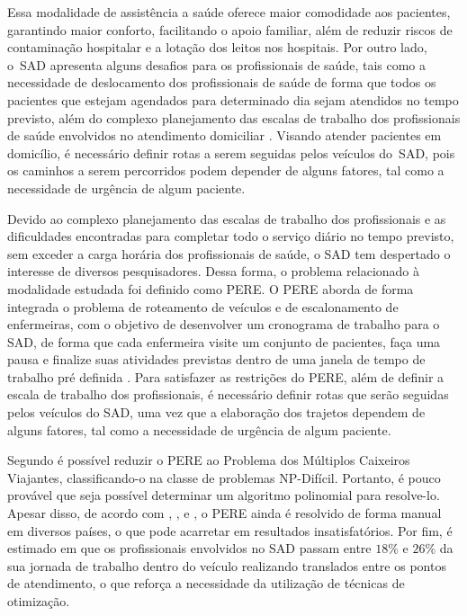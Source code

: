 Essa modalidade de assistência a saúde oferece maior comodidade aos pacientes, garantindo maior conforto, facilitando o apoio familiar, além de reduzir riscos de contaminação hospitalar e a lotação dos leitos nos hospitais.
Por outro lado, o~\ac{SAD} apresenta alguns desafios para os profissionais de saúde, tais como a necessidade de deslocamento dos profissionais de saúde de forma  que todos os pacientes que estejam agendados para determinado dia sejam atendidos no tempo previsto, além do complexo planejamento das escalas de trabalho dos profissionais de saúde envolvidos no atendimento domiciliar \cite{Kergosien:2009}. 
Visando atender pacientes em domicílio, é necessário definir rotas a serem seguidas pelos veículos do~\ac{SAD}, pois os caminhos a serem percorridos podem depender de alguns fatores, tal como a necessidade de urgência de algum paciente. 

Devido ao complexo planejamento das escalas de trabalho dos profissionais e as dificuldades encontradas para completar todo o serviço diário no tempo previsto, sem exceder a carga horária dos profissionais de saúde, o \ac{SAD} tem despertado o interesse de diversos pesquisadores. Dessa forma, o problema relacionado à modalidade estudada foi definido como \ac{PERE}.
O \ac{PERE} aborda de forma integrada o problema de roteamento de veículos e de escalonamento de enfermeiras, com o objetivo de desenvolver um cronograma de trabalho para o \ac{SAD}, de forma que cada enfermeira visite um conjunto de pacientes, faça uma pausa e finalize suas atividades previstas dentro de uma janela de tempo de trabalho pré definida \cite{trabelsi:2012}. 
Para satisfazer as restrições do \ac{PERE}, além de definir a escala de trabalho dos profissionais, é necessário definir rotas que serão seguidas pelos veículos do \ac{SAD}, uma vez que a elaboração dos trajetos dependem de alguns fatores, tal como a necessidade de urgência de algum paciente. 

Segundo  é possível reduzir o PERE ao Problema dos Múltiplos Caixeiros Viajantes, classificando-o na classe de problemas NP-Difícil. Portanto, é pouco provável que seja possível determinar um algoritmo polinomial para resolve-lo.
Apesar disso, de acordo com , , e , o \ac{PERE} ainda é resolvido de forma manual em diversos países, o que pode acarretar em resultados insatisfatórios. 
Por fim, é estimado em  que os profissionais envolvidos no \ac{SAD} passam entre $18\%$ e $26\%$ da sua jornada de trabalho dentro do veículo realizando translados entre os pontos de atendimento, o que reforça a necessidade da utilização de técnicas de otimização.

